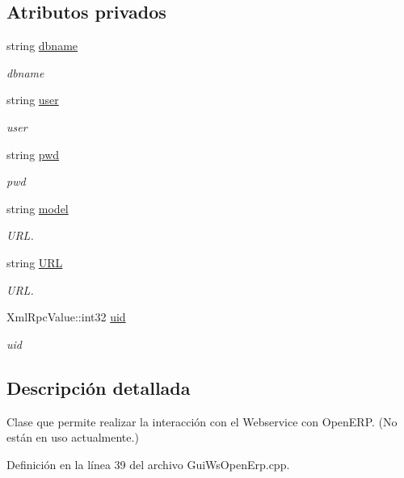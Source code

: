 \subsection*{Atributos privados}
\begin{DoxyCompactItemize}
\item 
string \hyperlink{classGuiWsOpenErp_aa872d8ffb6c11032ec0dcfd8ee49e234}{dbname}
\begin{DoxyCompactList}\small\item\em dbname \end{DoxyCompactList}\item 
string \hyperlink{classGuiWsOpenErp_a34037b0900d58859cc4c42e77f170d82}{user}
\begin{DoxyCompactList}\small\item\em user \end{DoxyCompactList}\item 
string \hyperlink{classGuiWsOpenErp_ad82141631eb4a41cd62b1c8892424a92}{pwd}
\begin{DoxyCompactList}\small\item\em pwd \end{DoxyCompactList}\item 
string \hyperlink{classGuiWsOpenErp_aa01da7bfce4fce442c869c6d1c988c4b}{model}
\begin{DoxyCompactList}\small\item\em U\+RL. \end{DoxyCompactList}\item 
string \hyperlink{classGuiWsOpenErp_a96c46b5aed53de6d0fca055f28862be5}{U\+RL}
\begin{DoxyCompactList}\small\item\em U\+RL. \end{DoxyCompactList}\item 
Xml\+Rpc\+Value\+::int32 \hyperlink{classGuiWsOpenErp_a791f1dd8b0b16f454ae7f1a2abe0a761}{uid}
\begin{DoxyCompactList}\small\item\em uid \end{DoxyCompactList}\end{DoxyCompactItemize}


\subsection{Descripción detallada}
Clase que permite realizar la interacción con el Webservice con Open\+E\+RP. (No están en uso actualmente.) 

Definición en la línea 39 del archivo Gui\+Ws\+Open\+Erp.\+cpp.



